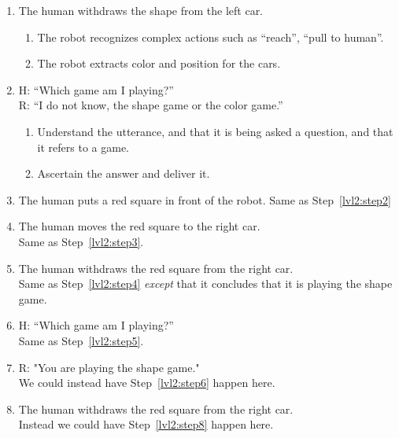 \documentclass{article}
\begin{document}
\begin{enumerate}
\item \label{lvl2:step4}
  The human withdraws the shape from the left car.
  \begin{enumerate}
  \item \label{lvl2:step4:detail1} The robot recognizes complex
    actions such as ``reach'', ``pull to human''.
  \item \label{lvl2:step4:detail2} The robot extracts color and
    position for the cars.
  \end{enumerate}

\item \label{lvl2:step5}
  H: ``Which game am I playing?''\\
  R: ``I do not know, the shape game or the color game.''
  \begin{enumerate}
  \item \label{lvl2:step5:detail1}Understand the utterance, and that
    it is being asked a question, and that it refers to a game.
  \item \label{lvl2:step5:detail2} Ascertain the answer and deliver
    it.
  \end{enumerate}

\item \label{lvl2:step6}
  The human puts a red square in front of the robot.
  Same as Step~\ref{lvl2:step2}

\item \label{lv2:step7}
  The human moves the red square to the right car.\\
  Same as Step~\ref{lvl2:step3}.

\item \label{lvl2:step8}
  The human withdraws the red square from the right car.\\
  Same as Step~\ref{lvl2:step4} \emph{except} that it concludes that it is
  playing the shape game.

\item \label{lvl2:step9}
  H: ``Which game am I playing?''\\
  Same as Step~\ref{lvl2:step5}.

\item \label{lvl2:step10}
  R: "You are playing the shape game."\\
  We could instead have Step~\ref{lvl2:step6} happen here.

\item \label{lvl2:step11}
  The human withdraws the red square from the right car. \\
  Instead we could have Step~\ref{lvl2:step8} happen here.


\end{enumerate}
\end{document}
